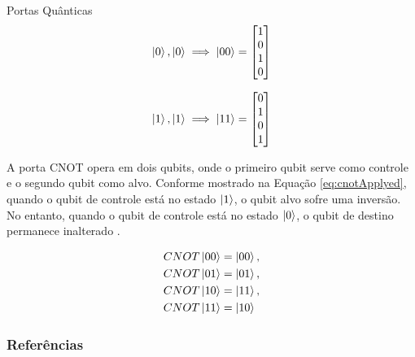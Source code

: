 \begin{frame}[allowframebreaks]{Portas Quânticas}
		\begin{equation}
			\label{eq:ketForTwoVectors01}
			\ket{0}, \ket{0} \implies
			\ket{00} = \begin{bmatrix}
				1 \\
				0 \\
				1 \\
				0
			\end{bmatrix}				
		\end{equation}
		
		\begin{equation}
			\label{eq:ketForTwoVectors02}
			\ket{1}, \ket{1} \implies
			\ket{11} = \begin{bmatrix}
				0 \\
				1 \\
				0 \\
				1
			\end{bmatrix}				
		\end{equation}
		
		\par A porta CNOT opera em dois qubits, onde o primeiro qubit serve como controle e o segundo qubit como alvo. Conforme mostrado na Equação \ref{eq:cnotApplyed}, quando o qubit de controle está no estado $\ket{1}$, o qubit alvo sofre uma inversão. No entanto, quando o qubit de controle está no estado $\ket{0}$, o qubit de destino permanece inalterado \cite{nielsen2002quantum}.
		
		\begin{equation}
			\label{eq:cnotApplyed}
			\begin{aligned}
				&CNOT\ket{00} = \ket{00}, \\
				&CNOT\ket{01} = \ket{01}, \\
				&CNOT\ket{10} = \ket{11}, \\
				&CNOT\ket{11} = \ket{10}
			\end{aligned}
		\end{equation}
	\end{frame}
	
	\begin{frame}[allowframebreaks]
		\frametitle{Referências}
		
	\end{frame}
	
